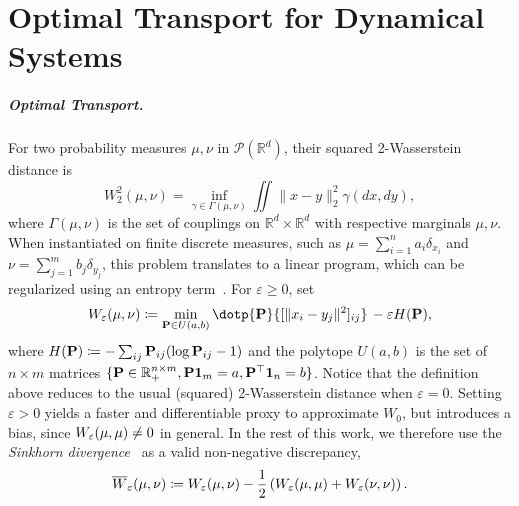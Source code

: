 \chapter{Optimal Transport for Dynamical Systems}
\label{cha:ot_background}

%


\paragraph{Optimal Transport.} 
For two probability measures $\mu, \nu$ in $\mathcal{P}(\mathbb{R}^d)$, their squared 2-Wasserstein distance is
\begin{equation} \label{eq:ot}
    W_2^2(\mu, \nu) = \inf_{\gamma\in \Gamma(\mu,\nu)}\iint \|x-y\|^2_2 \gamma(dx, dy),
\end{equation}
where $\Gamma(\mu, \nu)$ is the set of couplings on $\mathbb{R}^d\times\mathbb{R}^d$ with respective marginals $\mu, \nu$. When instantiated on finite discrete measures, such as $\mu=\sum_{i=1}^n a_i\delta_{x_i}$ and $\nu=\sum_{j=1}^m b_j\delta_{y_j}$, this problem translates to a linear program, which can be regularized using an entropy term~\citep{cuturi2013sinkhorn,Peyre2019computational}. For $\varepsilon\geq0$, set 
\begin{equation}\label{eq:reg-ot}
\We(\mu,\nu) \defeq \min_{\bP\in U(a,b)} \dotp{\bP}{[\|x_i - y_j\|^2]_{ij}}  \,-\varepsilon H(\bP),
\end{equation}
where $H(\mathbf{P}) \coloneqq -\sum_{ij} \mathbf{P}_{ij} (\log \mathbf{P}_{ij} - 1)$ and the polytope $U(a,b)$ is the set of $n\times m$ matrices $\{\mathbf{P}\in\mathbb{R}^{n \times m}_+, \mathbf{P}\mathbf{1}_m =a, \mathbf{P}^\top\mathbf{1}_n=b\}$. 
Notice that the definition above reduces to the usual (squared) 2-Wasserstein distance when $\varepsilon=0$. Setting $\varepsilon>0$ yields a faster and differentiable proxy to approximate $W_{0}$, but introduces a bias, since $W_{\varepsilon}(\mu,\mu)\ne 0$ in general. %
In the rest of this work, we therefore use the \textit{Sinkhorn divergence}~\citep{ramdas2017wasserstein,genevay2018,salimans2018improving,feydy2018interpolating} as %
a valid non-negative discrepancy,
\begin{equation} \label{eq:sinkhorn}
\overline{W}_{\varepsilon}(\mu,\nu) \coloneqq W_{\varepsilon}(\mu,\nu)-\frac{1}{2}\left(W_{\varepsilon}(\mu,\mu)+W_{\varepsilon}(\nu,\nu)\right).\\
\end{equation}

